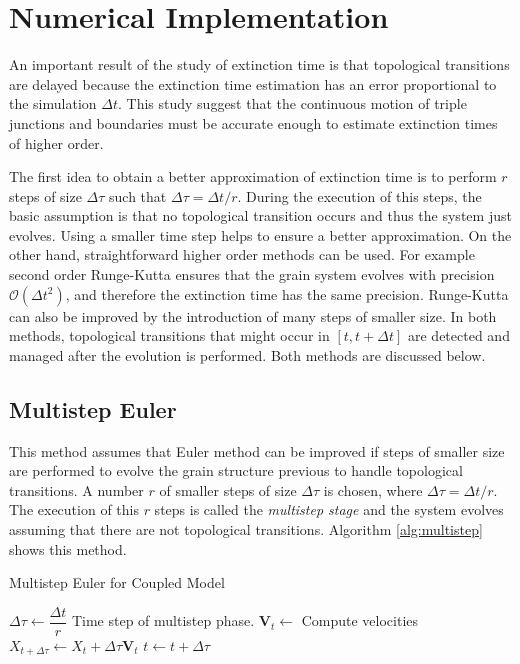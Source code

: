\section{Numerical Implementation}

An important result of the study of extinction time is that topological transitions are delayed because the extinction time estimation has an error proportional to the simulation $\Delta t$. This study suggest that the continuous motion of triple junctions and boundaries must be accurate enough to estimate extinction times of higher order. 

The first idea to obtain a better approximation of extinction time is to perform $r$ steps of size $\Delta \tau$ such that $\Delta \tau = \Delta t / r$. During the execution of this steps, the basic assumption is that no topological transition occurs and thus the system just evolves. Using a smaller time step helps to ensure a better approximation. On the other hand, straightforward higher order methods can be used. For example second order Runge-Kutta ensures that the grain system evolves with precision $\mathcal{O}(\Delta t^2)$, and therefore the extinction time has the same precision. Runge-Kutta can also be improved by the introduction of many steps of smaller size. 
In both methods, topological transitions that might occur in $[t, t+\Delta t]$ are detected and managed after the evolution is performed. Both methods are discussed below.

\subsection{Multistep Euler}

This method assumes that Euler method can be improved if steps of smaller size are performed to evolve the grain structure previous to handle topological transitions. A number $r$ of smaller steps of size $\Delta \tau$ is chosen, where $\Delta \tau = \Delta t / r$. The execution of this $r$ steps is called the \emph{multistep stage} and the system evolves assuming that there are not topological transitions. Algorithm \ref{alg:multistep} shows this method.

\begin{algorithm}
\caption{Multistep Euler for Coupled Model}
\label{alg:multistep}
\begin{algorithmic}[1]
\State $\Delta \tau \gets \dfrac{\Delta t}{r}$ Time step of multistep phase.
\State $\mathbf{V}_t \gets$ Compute velocities
\State $X_{t + \Delta \tau} \gets X_{t} + \Delta \tau \mathbf{V}_t$
\State $t \gets t + \Delta \tau$
\EndFor
\EndProcedure
\end{algorithmic}
\end{algorithm}

